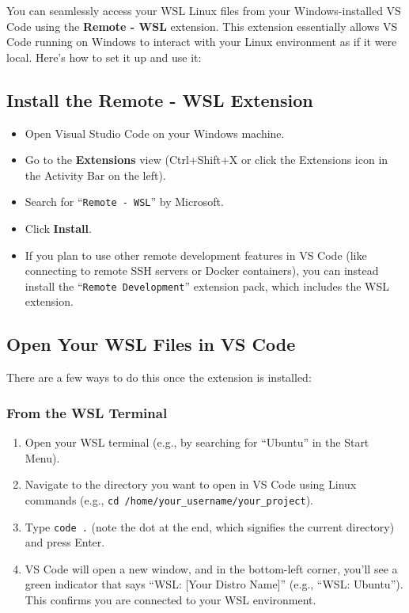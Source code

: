 \documentclass{article}
\begin{document}
You can seamlessly access your WSL Linux files from your Windows-installed VS Code using the \textbf{Remote - WSL} extension. This extension essentially allows VS Code running on Windows to interact with your Linux environment as if it were local. Here's how to set it up and use it:

\subsection{Install the Remote - WSL Extension}

\begin{itemize}
    \item Open Visual Studio Code on your Windows machine.
    \item Go to the \textbf{Extensions} view (Ctrl+Shift+X or click the Extensions icon in the Activity Bar on the left).
    \item Search for ``\texttt{Remote - WSL}'' by Microsoft.
    \item Click \textbf{Install}.
    \item If you plan to use other remote development features in VS Code (like connecting to remote SSH servers or Docker containers), you can instead install the ``\texttt{Remote Development}'' extension pack, which includes the WSL extension.
\end{itemize}

\subsection{Open Your WSL Files in VS Code}

There are a few ways to do this once the extension is installed:

\subsubsection{From the WSL Terminal}
\begin{enumerate}
    \item Open your WSL terminal (e.g., by searching for ``Ubuntu'' in the Start Menu).
    \item Navigate to the directory you want to open in VS Code using Linux commands (e.g., \texttt{cd /home/your\_username/your\_project}).
    \item Type \texttt{code .} (note the dot at the end, which signifies the current directory) and press Enter.
    \item VS Code will open a new window, and in the bottom-left corner, you'll see a green indicator that says ``WSL: [Your Distro Name]'' (e.g., ``WSL: Ubuntu''). This confirms you are connected to your WSL environment.
\end{enumerate}
\end{document}
